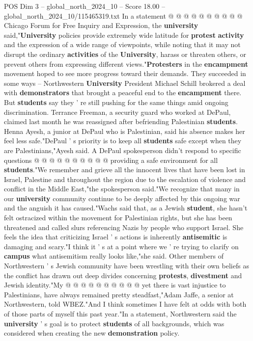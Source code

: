 \begin{textsample}{POS Dim 3 – global\_north\_2024\_10 – Score 18.00 – global\_north\_2024\_10/115465319.txt}
In a statement @ @ @ @ @ @ @ @ @ @ Chicago Forum for Free Inquiry and Expression, the \textbf{university} said,"\textbf{University} policies provide extremely wide latitude for \textbf{protest} \textbf{activity} and the expression of a wide range of viewpoints, while noting that it may not disrupt the ordinary \textbf{activities} of the \textbf{University}, harass or threaten others, or prevent others from expressing different views."\textbf{Protesters} in the \textbf{encampment} movement hoped to see more progress toward their demands.
They succeeded in some ways -- Northwestern \textbf{University} President Michael Schill brokered a deal with \textbf{demonstrators} that brought a peaceful end to the \textbf{encampment} there.
But \textbf{students} say they ' re still pushing for the same things amid ongoing discrimination.
Terrance Freeman, a security guard who worked at DePaul, claimed last month he was reassigned after befriending Palestinian \textbf{students}.
Henna Ayesh, a junior at DePaul who is Palestinian, said his absence makes her feel less safe."DePaul ' s priority is to keep all \textbf{students} safe except when they are Palestinians,"Ayesh said.
A DePaul spokesperson didn't respond to specific questions @ @ @ @ @ @ @ @ @ @ providing a safe environment for all \textbf{students}."We remember and grieve all the innocent lives that have been lost in Israel, Palestine and throughout the region due to the escalation of violence and conflict in the Middle East,"the spokesperson said."We recognize that many in our \textbf{university} community continue to be deeply affected by this ongoing war and the anguish it has caused."Wachs said that, as a Jewish \textbf{student}, she hasn't felt ostracized within the movement for Palestinian rights, but she has been threatened and called slurs referencing Nazis by people who support Israel.
She feels the idea that criticizing Israel ' s actions is inherently \textbf{antisemitic} is damaging and scary."I think it ' s at a point where we ' re trying to clarify on \textbf{campus} what antisemitism really looks like,"she said.
Other members of Northwestern ' s Jewish community have been wrestling with their own beliefs as the conflict has drawn out deep divides concerning \textbf{protests}, \textbf{divestment} and Jewish identity."My @ @ @ @ @ @ @ @ @ @ yet there is vast injustice to Palestinians, have always remained pretty steadfast,"Adam Jaffe, a senior at Northwestern, told WBEZ."And I think sometimes I have felt at odds with both of those parts of myself this past year."In a statement, Northwestern said the \textbf{university} ' s goal is to protect \textbf{students} of all backgrounds, which was considered when creating the new \textbf{demonstration} policy.

\end{textsample}
